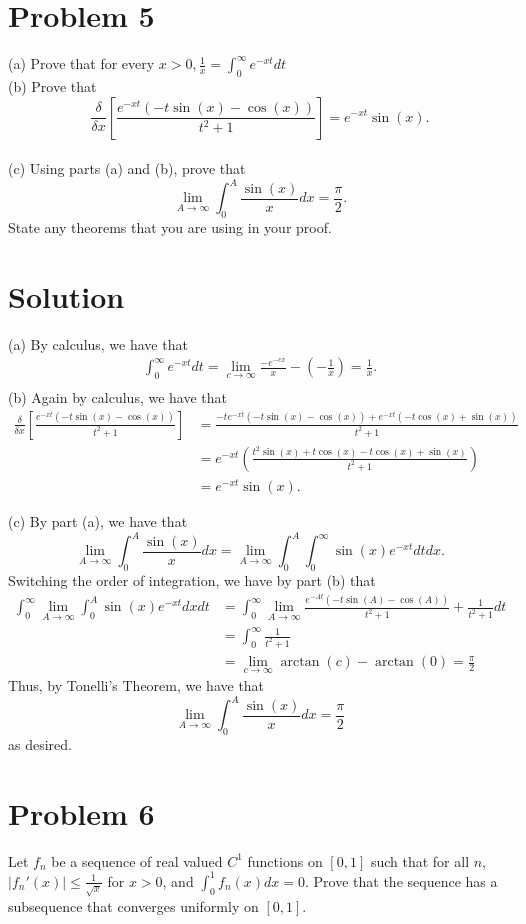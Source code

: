 \documentclass{article}
\begin{document}
\section*{Problem 5}
(a) Prove that for every $x>0,\frac{1}{x}=\int_0^\infty e^{-xt}dt$\\

\noindent (b) Prove that $$\frac{\delta}{\delta{x}}\left[\frac{e^{-xt}(-t\sin(x)-\cos(x))}{t^2+1}\right]=e^{-xt}\sin(x).$$\\

\noindent (c) Using parts (a) and (b), prove that $$\lim_{A\rightarrow\infty}\int_0^A\frac{\sin(x)}{x}dx=\frac{\pi}{2}.$$ State any theorems that you are using in your proof.


\section*{Solution}
(a) By calculus, we have that
\begin{align*}
\int_0^\infty e^{-xt}dt=\lim_{c\rightarrow\infty}\frac{-e^{-cx}}{x}-\left(-\frac{1}{x}\right)=\frac{1}{x}.\\
\end{align*}
(b) Again by calculus, we have that
\begin{align*}
\frac{\delta}{\delta{x}}\left[\frac{e^{-xt}(-t\sin(x)-\cos(x))}{t^2+1}\right]&=\frac{-te^{-xt}(-t\sin(x)-\cos(x))+e^{-xt}(-t\cos(x)+\sin(x))}{t^2+1}\\
&=e^{-xt}\left(\frac{t^2\sin(x)+t\cos(x)-t\cos(x)+\sin(x)}{t^2+1}\right)\\
&=e^{-xt}\sin(x).
\end{align*}

\noindent (c) By part (a), we have that $$\lim_{A\rightarrow\infty}\int_0^A\frac{\sin(x)}{x}dx=\lim_{A\rightarrow\infty}\int_0^A\int_0^\infty\sin(x)e^{-xt}dtdx.$$  Switching the order of integration, we have by part (b) that
\begin{align*}
\int_0^\infty\lim_{A\rightarrow\infty}\int_0^A\sin(x)e^{-xt}dxdt&=\int_0^\infty\lim_{A\rightarrow\infty} \frac{e^{-At}(-t\sin(A)-\cos(A))}{t^2+1}+\frac{1}{t^2+1}dt\\
&=\int_0^\infty\frac{1}{t^2+1}\\
&=\lim_{c\rightarrow\infty}\arctan(c)-\arctan(0)=\frac{\pi}{2}
\end{align*}
Thus, by Tonelli's Theorem, we have that $$\lim_{A\rightarrow\infty}\int_0^A\frac{\sin(x)}{x}dx=\frac{\pi}{2}$$ as desired.

\section*{Problem 6}
Let $f_n$ be a sequence of real valued $C^1$ functions on $[0,1]$ such that for all $n$, $|f_n'(x)|\leq\frac{1}{\sqrt{x}}$ for $x>0$, and $\int_0^1f_n(x)dx=0$.  Prove that the sequence has a subsequence that converges uniformly on $[0,1]$.
\end{document}
